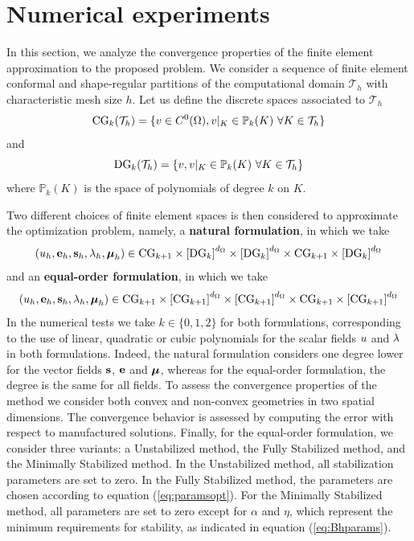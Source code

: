 \section{Numerical experiments}


In this section, we analyze the convergence properties of the finite element approximation to the proposed problem. We consider a sequence of finite element conformal and shape-regular partitions of the computational domain $\mathcal{T}_h$ with characteristic mesh size $h$. 
Let us define the discrete spaces associated to $\mathcal{T}_h$
$$
\text{CG}_{k}(\mathcal{T}_h) = \{v \in C^0(\Omega), v|_K \in \mathbb{P}_k(K)~\forall K \in \mathcal{T}_h\}
$$
and 
$$
\text{DG}_{k}(\mathcal{T}_h) = \{v, v|_K \in \mathbb{P}_k(K)~\forall K \in \mathcal{T}_h\}
$$
where $\mathbb{P}_k(K)$ is the space of polynomials of degree $k$ on $K$.

Two different choices of finite element spaces is then considered to approximate
the optimization problem, namely, a \textbf{natural formulation}, in which we take 
\begin{equation}\label{eq:natural_func_spaces}
	\left(u_{h}, \mathbf{e}_{h}, \mathbf{s}_{h}, \lambda_{h}, \boldsymbol{\mu}_{h}\right) \in \text{CG}_{k+1} \times \left[\text{DG}_{k}\right]^{d_{\Omega}} \times \left[\text{DG}_{k}\right]^{d_{\Omega}} \times \text{CG}_{k+1} \times \left[\text{DG}_{k}\right]^{d_{\Omega}} 
\end{equation} 
and an \textbf{equal-order formulation}, in which we take
\begin{equation}\label{eq:equal_order_func_spaces}
\left(u_{h}, \mathbf{e}_{h}, \mathbf{s}_{h}, \lambda_{h}, \boldsymbol{\mu}_{h}\right)  \in \text{CG}_{k+1} \times \left[\text{CG}_{k+1}\right]^{d_{\Omega}} \times \left[\text{CG}_{k+1}\right]^{d_{\Omega}} \times \text{CG}_{k+1} \times \left[\text{CG}_{k+1}\right]^{d_{\Omega}}
\end{equation}
In the numerical tests we take $k \in \{0, 1, 2\}$ for both formulations, corresponding to the use of linear, quadratic or cubic polynomials for the scalar fields $u$ and $\lambda$ in both formulations. Indeed, the natural formulation
considers one degree lower for the vector fields $\mathbf{s}$, $\mathbf{e}$ and $\boldsymbol{\mu}$, whereas for the equal-order formulation, the degree is the same for all fields. 
To assess the convergence properties of the method we consider both convex and non-convex geometries in two spatial dimensions. The convergence behavior is assessed by computing the error with respect to manufactured solutions.
Finally, for the equal-order formulation, we consider three variants: a Unstabilized method, the Fully Stabilized method, and the Minimally Stabilized method.
In the Unstabilized method, all stabilization parameters are set to zero.
In the Fully Stabilized method, the parameters are chosen according to equation (\ref{eq:paramsopt}). For the Minimally Stabilized method, all parameters are set to zero except for $\alpha$ and $\eta$, which represent the minimum requirements for stability, as indicated in equation (\ref{eq:Bhparams}).

